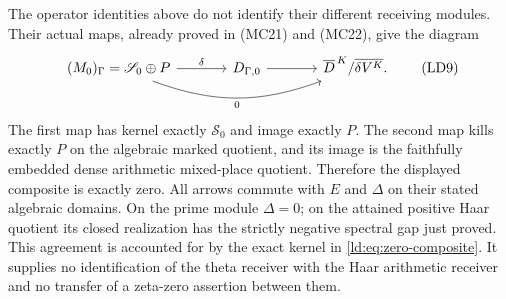 The operator identities above do not identify their different
receiving modules. Their actual maps, already proved in (MC21)
and (MC22), give the diagram
\[
 \begin{tikzcd}[column sep=large]
 (M_0)_\Gamma=\mathscr S_0\oplus P
 \arrow[r,"\delta"]\arrow[rr,bend right=20,"0"']
 &D_{\Gamma,0}\arrow[r]
 &\overline D^{\,K}/\overline{\delta V^K}.
 \end{tikzcd}
 \tag{LD9}\label{ld:eq:zero-composite}
\]
The first map has kernel exactly $\mathscr S_0$ and image
exactly $P$. The second map kills exactly $P$ on the algebraic
marked quotient, and its image is the faithfully embedded dense
arithmetic mixed-place quotient. Therefore the displayed composite
is exactly zero. All arrows commute with $E$ and $\Delta$ on
their stated algebraic domains. On the prime module $\Delta=0$;
on the attained positive Haar quotient its closed realization
has the strictly negative spectral gap just proved. This
agreement is accounted for by the exact kernel in
\eqref{ld:eq:zero-composite}. It supplies no identification of the
theta receiver with the Haar arithmetic receiver and no transfer
of a zeta-zero assertion between them.

